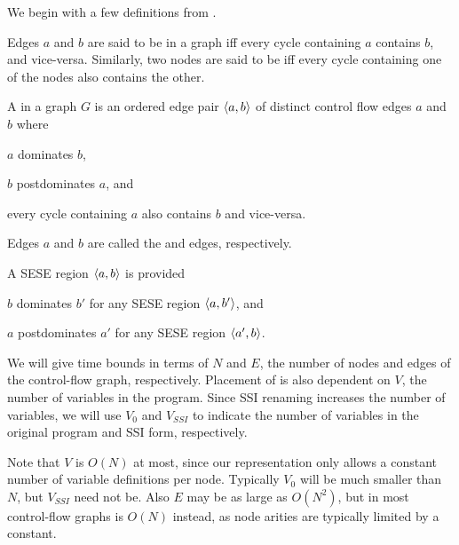 \documentclass[12pt,titlepage,twoside]{article}
\begin{document}
We begin with a few definitions from \cite{johnson94:pst}.
\begin{definition}
Edges $a$ and $b$ are said to be  in a
graph iff every cycle containing $a$ contains $b$, and vice-versa.
Similarly, two nodes are said to be  iff
every cycle containing one of the nodes also contains the other.
\end{definition}
\begin{definition}
A  in a graph $G$ is an ordered edge pair
$\left\langle a,b \right\rangle$ of distinct control flow edges $a$ and $b$ where
\begin{tightenum}
\item $a$ dominates $b$,
\item $b$ postdominates $a$, and
\item every cycle containing $a$ also contains $b$ and vice-versa.
\end{tightenum}
Edges $a$ and $b$ are called the  and  edges,
respectively.
\end{definition}
\begin{definition}
A SESE region $\left\langle a,b \right\rangle$ is  provided
\begin{tightenum}
\item $b$ dominates $b'$ for any SESE region $\left\langle a,b' \right\rangle$, and
\item $a$ postdominates $a'$ for any SESE region $\left\langle a',b \right\rangle$.
\end{tightenum}
\end{definition}

We will give time bounds in terms of $N$ and $E$, the number of nodes
and edges of the control-flow graph, respectively.
Placement of 
is also dependent on $V$, the number of variables in the program.
Since SSI renaming increases the number of variables, we will use
$V_0$ and $V_{SSI}$ to indicate the number of variables in the
original program and SSI form, respectively.

Note that $V$ is $O(N)$ at most, since our representation only allows
a constant number of variable definitions per node.  Typically $V_0$
will be much smaller than $N$, but $V_{SSI}$ need not be.  Also $E$
may be as large as $O(N^2)$, but in most control-flow graphs is $O(N)$
instead, as node arities are typically limited by a constant.
\end{document}
